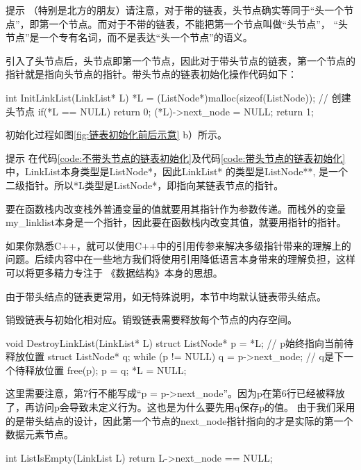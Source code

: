 \begin{notebox}{提示}
    （特别是北方的朋友）请注意，对于带的链表，头节点确实等同于“头一个节点”，即第一个节点。而对于不带的链表，不能把第一个节点叫做“头节点”，
    “头节点”是一个专有名词，而不是表达“头一个节点”的语义。
\end{notebox}

引入了头节点后，头节点即第一个节点，因此对于带头节点的链表，第一个节点的指针就是指向头节点的指针。带头节点的链表初始化操作代码如下：
\begin{cppcodeNum}[label={code:带头节点的链表初始化}, codetitle={带头节点的链表初始化}]
    int InitLinkList(LinkList* L) {
        *L = (ListNode*)malloc(sizeof(ListNode));    // 创建头节点
        if(*L == NULL) {
            return 0;
        }
        (*L)->next_node = NULL;    
        return 1;
    }
\end{cppcodeNum}
初始化过程如图\ref{fig:链表初始化前后示意} b）所示。

\begin{notebox}{提示}
    在代码\ref{code:不带头节点的链表初始化}及代码\ref{code:带头节点的链表初始化}中，LinkList本身类型是ListNode*，因此LinkList* 的类型是ListNode**,
    是一个二级指针。所以*L类型是ListNode*，即指向某链表节点的指针。
    
    要在函数栈内改变栈外普通变量的值就要用其指针作为参数传递。而栈外的变量my\_linklist本身是一个指针，因此要在函数栈内改变其值，就要用指针的指针。

    如果你熟悉C++，就可以使用C++中的引用传参来解决多级指针带来的理解上的问题。后续内容中在一些地方我们将使用引用降低语言本身带来的理解负担，这样可以将更多精力专注于
    《数据结构》本身的思想。
\end{notebox}
由于带头结点的链表更常用，如无特殊说明，本节中均默认链表带头结点。

销毁链表与初始化相对应。销毁链表需要释放每个节点的内存空间。
\begin{cppcode}
    void DestroyLinkList(LinkList* L) {
        struct ListNode* p = *L;    // p始终指向当前待释放位置
        struct ListNode* q;
        while (p != NULL) {
            q = p->next_node;       // q是下一个待释放位置
            free(p);
            p = q;
        }
        *L = NULL;
    }
\end{cppcode}
这里需要注意，第7行不能写成“p = p->next\_node”。因为p在第6行已经被释放了，再访问p会导致未定义行为。这也是为什么要先用q保存p的值。
由于我们采用的是带头结点的设计，因此第一个节点的next\_node指针指向的才是实际的第一个数据元素节点。
\begin{cppcode}
    int ListIsEmpty(LinkList L) {
        return L->next_node == NULL;
    }
\end{cppcode}

